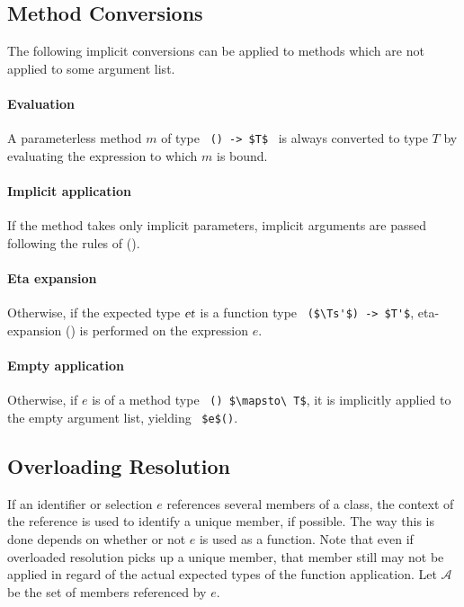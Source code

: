 \subsection{Method Conversions}
\label{sec:method-conversions}

The following implicit conversions can be applied to methods which are not applied to some argument list. 

\paragraph{Evaluation}
A parameterless method $m$ of type ~\lstinline!() -> $T$!~ is always converted to type $T$ by evaluating the expression to which $m$ is bound. 

\paragraph{Implicit application}
If the method takes only implicit parameters, implicit arguments are passed following the rules of ().

\paragraph{Eta expansion}
Otherwise, if the expected type $\mbox{\sl et}$ is a function type ~\lstinline!($\Ts'$) -> $T'$!, eta-expansion () is performed on the expression $e$. 

\paragraph{Empty application}
Otherwise, if $e$ is of a method type ~\lstinline!() $\mapsto\ T$!, it is implicitly applied to the empty argument list, yielding ~\lstinline!$e$()!. 






\subsection{Overloading Resolution}
\label{sec:overloading-resolution}

If an identifier or selection $e$ references several members of a class, the context of the reference is used to identify a unique member, if possible. The way this is done depends on whether or not $e$ is used as a function. Note that even if overloaded resolution picks up a unique member, that member still may not be applied in regard of the actual expected types of the function application. Let $\mathcal{A}$ be the set of members referenced by $e$. 


